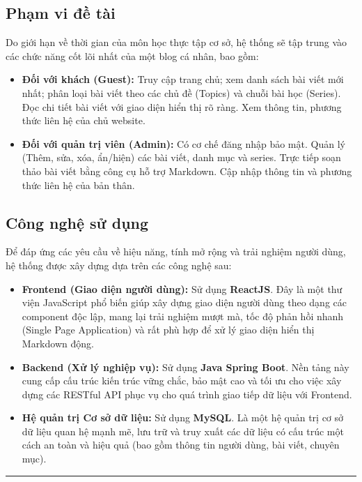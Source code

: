 \documentclass[a4paper,12pt]{article}
\begin{document}
\subsection{Phạm vi đề tài}
Do giới hạn về thời gian của môn học thực tập cơ sở, hệ thống sẽ tập trung vào các chức năng cốt lõi nhất của một blog cá nhân, bao gồm:

\begin{itemize}
    \item \textbf{Đối với khách (Guest):} Truy cập trang chủ; xem danh sách bài viết mới nhất; phân loại bài viết theo các chủ đề (Topics) và chuỗi bài học (Series). Đọc chi tiết bài viết với giao diện hiển thị rõ ràng. Xem thông tin, phương thức liên hệ của chủ website.
    \item \textbf{Đối với quản trị viên (Admin):} Có cơ chế đăng nhập bảo mật. Quản lý (Thêm, sửa, xóa, ẩn/hiện) các bài viết, danh mục và series. Trực tiếp soạn thảo bài viết bằng công cụ hỗ trợ Markdown. Cập nhập thông tin và phương thức liên hệ của bản thân.
\end{itemize}

\subsection{Công nghệ sử dụng}
Để đáp ứng các yêu cầu về hiệu năng, tính mở rộng và trải nghiệm người dùng, hệ thống được xây dựng dựa trên các công nghệ sau:

\begin{itemize}
    \item \textbf{Frontend (Giao diện người dùng):} Sử dụng \textbf{ReactJS}. Đây là một thư viện JavaScript phổ biến giúp xây dựng giao diện người dùng theo dạng các component độc lập, mang lại trải nghiệm mượt mà, tốc độ phản hồi nhanh (Single Page Application) và rất phù hợp để xử lý giao diện hiển thị Markdown động.
    \item \textbf{Backend (Xử lý nghiệp vụ):} Sử dụng \textbf{Java Spring Boot}. Nền tảng này cung cấp cấu trúc kiến trúc vững chắc, bảo mật cao và tối ưu cho việc xây dựng các RESTful API phục vụ cho quá trình giao tiếp dữ liệu với Frontend.
    \item \textbf{Hệ quản trị Cơ sở dữ liệu:} Sử dụng \textbf{MySQL}. Là một hệ quản trị cơ sở dữ liệu quan hệ mạnh mẽ, lưu trữ và truy xuất các dữ liệu có cấu trúc một cách an toàn và hiệu quả (bao gồm thông tin người dùng, bài viết, chuyên mục).
\end{itemize}

\vspace{1em}
\hrule
\vspace{1em}
\end{document}
